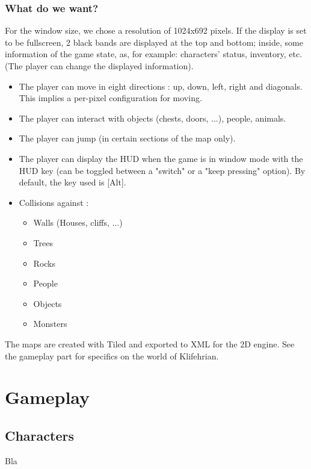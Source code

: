 \documentclass[a4paper,12pt]{book}
\begin{document}
\section*{What do we want?}
For the window size, we chose a resolution of 1024x692 pixels. If the display is set to be fullscreen, 2 black bands are displayed at the top and bottom; inside, some information of the game state, as, for example: characters' status, inventory, etc. (The player can change the displayed information).
\begin{itemize}
	\item The player can move in eight directions : up, down, left, right and diagonals. This implies a per-pixel configuration for moving.
	\item The player can interact with objects (chests, doors, ...), people, animals.
	\item The player can jump (in certain sections of the map only).
	\item The player can display the HUD when the game is in window mode with the HUD key (can be toggled between a "switch" or a "keep pressing" option). By default, the key used is [Alt].
	\item Collisions against :
	\begin{itemize}
		\item Walls (Houses, cliffs, ...)
		\item Trees
		\item Rocks
		\item People
		\item Objects
		\item Monsters
	\end{itemize}
\end{itemize}
The maps are created with Tiled and exported to XML for the 2D engine. See the gameplay part for specifics on the world of Klifehrian.
\part{Gameplay}
\chapter{Characters}
Bla
\end{document}
